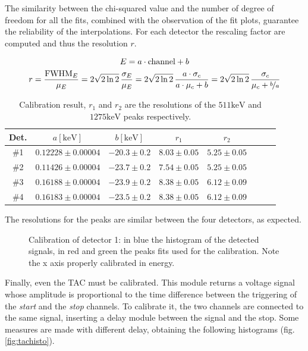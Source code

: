 \documentclass[11pt,a4 paper]{article}
\let\oldfrac\frac
\renewcommand{\frac}[3][d]{\ifthenelse{\equal{#1}{d}}{\oldfrac{#2}{#3}}{\nicefrac{#2}{#3}}}
\begin{document}
The similarity between the chi-squared value and the number of degree of freedom for all the fits, combined with the observation of the fit plots, guarantee the reliability of the interpolations. For each detector the rescaling factor are computed and thus the resolution $r$.

\begin{gather*}
    E = a \cdot \text{channel} + b \\
    r = \frac{\text{FWHM}_E}{\mu_E} = 2\sqrt{2\ln2} \,\frac{\sigma_E}{\mu_E} = 2\sqrt{2\ln2}\, \frac{a \cdot \sigma_c}{a \cdot \mu_c + b} = 2\sqrt{2\ln2} \,\frac{\sigma_c}{\mu_c + \frac[f]{b}{a}}
\end{gather*}

\begin{table}[H]
    \centering
    \begin{tabular}{cccccccc}
        \toprule
        Det. & $a [\si{\kilo\electronvolt}]$ & $b [\si{\kilo\electronvolt}]$ & $r_1$ & $r_2$ \\
        \midrule
        \#1 & $0.12228\pm0.00004$ & $-20.3\pm0.2$ & $8.03\pm0.05$ & $5.25\pm0.05$ \\
        \#2 & $0.11426\pm0.00004$ & $-23.7\pm0.2$ & $7.54\pm0.05$ & $5.25\pm0.05$ \\
        \#3 & $0.16188\pm0.00004$ & $-23.9\pm0.2$ & $8.38\pm0.05$ & $6.12\pm0.09$ \\
        \#4 & $0.16183\pm0.00004$ & $-23.5\pm0.2$ & $8.38\pm0.05$ & $6.12\pm0.09$ \\
        \bottomrule
    \end{tabular}
    \caption{Calibration result, $r_1$ and $r_2$ are the resolutions of the $511\si{\kilo\electronvolt}$ and $1275\si{\kilo\electronvolt}$ peaks respectively.}
    \label{tab:calib2}
\end{table}
The resolutions for the peaks are similar between the four detectors, as expected.

\begin{figure}[H]
    \centering
    \caption{Calibration of detector 1: in blue the histogram of the detected signals, in red and green the peaks fits used for the calibration. Note the x axis properly calibrated in energy.}
    \label{fig:det1_calibr}
\end{figure}


Finally, even the TAC must be calibrated. This module returns a voltage signal whose amplitude is proportional to the time difference between the triggering of the \emph{start} and the \emph{stop} channels. To calibrate it, the two channels are connected to the same signal, inserting a delay module between the signal and the stop. Some measures are made with different delay, obtaining the following histograms (fig. \ref{fig:tachisto}).
\end{document}
